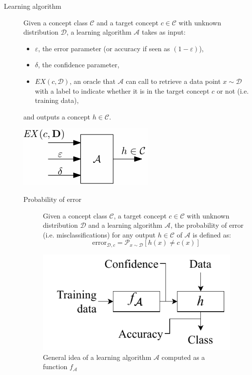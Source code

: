\begin{description}
    \item[Learning algorithm] 
        Given a concept class $\mathcal{C}$ and a target concept $c \in \mathcal{C}$ with unknown distribution $\mathcal{D}$, 
        a learning algorithm $\mathcal{A}$ takes as input:
        \begin{itemize}
            \item $\varepsilon$, the error parameter (or accuracy if seen as $(1-\varepsilon)$),
            \item $\delta$, the confidence parameter,
            \item $EX(c, \mathcal{D})$, an oracle that $\mathcal{A}$ can call to retrieve a data point $x \sim \mathcal{D}$ 
                with a label to indicate whether it is in the target concept $c$ or not (i.e. training data),
        \end{itemize}
        and outputs a concept $h \in \mathcal{C}$. 
        \begin{center}
            \includegraphics[width=0.3\linewidth]{./img/_learning_algorithm.pdf}
        \end{center}

        \begin{description}
            \item[Probability of error] 
                Given a concept class $\mathcal{C}$, 
                a target concept $c \in \mathcal{C}$ with unknown distribution $\mathcal{D}$ and 
                a learning algorithm $\mathcal{A}$,
                the probability of error (i.e. misclassifications) for any output $h \in \mathcal{C}$ of $\mathcal{A}$ is defined as:
                \[ \text{error}_{\mathcal{D}, c} = \mathcal{P}_{x \sim \mathcal{D}}[ h(x) \neq c(x) ] \]
        \end{description}

        \begin{figure}[H]
            \centering
            \includegraphics[width=0.35\linewidth]{./img/_learning_model.pdf}
            \caption{General idea of a learning algorithm $\mathcal{A}$ computed as a function $f_\mathcal{A}$}
        \end{figure}


\end{description}
